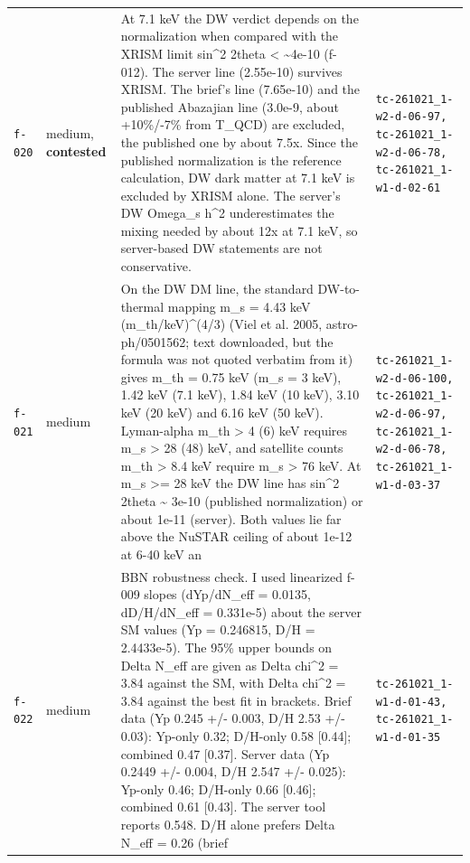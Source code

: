 \documentclass[11pt,a4paper]{article}
\begin{document}
\begin{longtable}{@{}p{}p{}p{}p{}@{}}
\texttt{f-020} & medium, \textbf{contested} & At 7.1 keV the DW verdict depends on the normalization when compared with the XRISM limit sin\textasciicircum{}2 2theta \textless{} \textasciitilde{}4e-10 (f-012). The server line (2.55e-10) survives XRISM. The brief's line (7.65e-10) and the published Abazajian line (3.0e-9, about +10\%/-7\% from T\_QCD) are excluded, the published one by about 7.5x. Since the published normalization is the reference calculation, DW dark matter at 7.1 keV is excluded by XRISM alone. The server's DW Omega\_s h\textasciicircum{}2 underestimates the mixing needed by about 12x at 7.1 keV, so server-based DW statements are not conservative. & \texttt{tc-261021\_\allowbreak{}1-w2-d-06-97,\allowbreak{} tc-261021\_\allowbreak{}1-w2-d-06-78,\allowbreak{} tc-261021\_\allowbreak{}1-w1-d-02-61} \\
\texttt{f-021} & medium & On the DW DM line, the standard DW-to-thermal mapping m\_s = 4.43 keV (m\_th/keV)\textasciicircum{}(4/3) (Viel et al. 2005, astro-ph/0501562; text downloaded, but the formula was not quoted verbatim from it) gives m\_th = 0.75 keV (m\_s = 3 keV), 1.42 keV (7.1 keV), 1.84 keV (10 keV), 3.10 keV (20 keV) and 6.16 keV (50 keV). Lyman-alpha m\_th \textgreater{} 4 (6) keV requires m\_s \textgreater{} 28 (48) keV, and satellite counts m\_th \textgreater{} 8.4 keV require m\_s \textgreater{} 76 keV. At m\_s \textgreater{}= 28 keV the DW line has sin\textasciicircum{}2 2theta \textasciitilde{} 3e-10 (published normalization) or about 1e-11 (server). Both values lie far above the NuSTAR ceiling of about 1e-12 at 6-40 keV an & \texttt{tc-261021\_\allowbreak{}1-w2-d-06-100,\allowbreak{} tc-261021\_\allowbreak{}1-w2-d-06-97,\allowbreak{} tc-261021\_\allowbreak{}1-w2-d-06-78,\allowbreak{} tc-261021\_\allowbreak{}1-w1-d-03-37} \\
\texttt{f-022} & medium & BBN robustness check. I used linearized f-009 slopes (dYp/dN\_eff = 0.0135, dD/H/dN\_eff = 0.331e-5) about the server SM values (Yp = 0.246815, D/H = 2.4433e-5). The 95\% upper bounds on Delta N\_eff are given as Delta chi\textasciicircum{}2 = 3.84 against the SM, with Delta chi\textasciicircum{}2 = 3.84 against the best fit in brackets. Brief data (Yp 0.245 +/- 0.003, D/H 2.53 +/- 0.03): Yp-only 0.32; D/H-only 0.58 [0.44]; combined 0.47 [0.37]. Server data (Yp 0.2449 +/- 0.004, D/H 2.547 +/- 0.025): Yp-only 0.46; D/H-only 0.66 [0.46]; combined 0.61 [0.43]. The server tool reports 0.548. D/H alone prefers Delta N\_eff = 0.26 (brief & \texttt{tc-261021\_\allowbreak{}1-w1-d-01-43,\allowbreak{} tc-261021\_\allowbreak{}1-w1-d-01-35} \\
\bottomrule\end{longtable}
\end{document}
